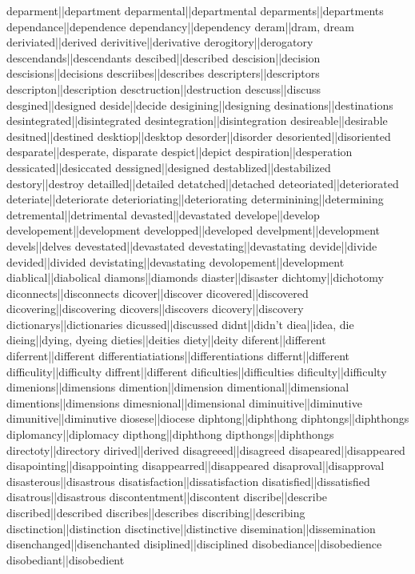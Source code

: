 deparment||department
deparmental||departmental
deparments||departments
dependance||dependence
dependancy||dependency
deram||dram, dream
deriviated||derived
derivitive||derivative
derogitory||derogatory
descendands||descendants
descibed||described
descision||decision
descisions||decisions
descriibes||describes
descripters||descriptors
descripton||description
desctruction||destruction
descuss||discuss
desgined||designed
deside||decide
desigining||designing
desinations||destinations
desintegrated||disintegrated
desintegration||disintegration
desireable||desirable
desitned||destined
desktiop||desktop
desorder||disorder
desoriented||disoriented
desparate||desperate, disparate
despict||depict
despiration||desperation
dessicated||desiccated
dessigned||designed
destablized||destabilized
destory||destroy
detailled||detailed
detatched||detached
deteoriated||deteriorated
deteriate||deteriorate
deterioriating||deteriorating
determinining||determining
detremental||detrimental
devasted||devastated
develope||develop
developement||development
developped||developed
develpment||development
devels||delves
devestated||devastated
devestating||devastating
devide||divide
devided||divided
devistating||devastating
devolopement||development
diablical||diabolical
diamons||diamonds
diaster||disaster
dichtomy||dichotomy
diconnects||disconnects
dicover||discover
dicovered||discovered
dicovering||discovering
dicovers||discovers
dicovery||discovery
dictionarys||dictionaries
dicussed||discussed
didnt||didn't
diea||idea, die
dieing||dying, dyeing
dieties||deities
diety||deity
diferent||different
diferrent||different
differentiatiations||differentiations
differnt||different
difficulity||difficulty
diffrent||different
dificulties||difficulties
dificulty||difficulty
dimenions||dimensions
dimention||dimension
dimentional||dimensional
dimentions||dimensions
dimesnional||dimensional
diminuitive||diminutive
dimunitive||diminutive
diosese||diocese
diphtong||diphthong
diphtongs||diphthongs
diplomancy||diplomacy
dipthong||diphthong
dipthongs||diphthongs
directoty||directory
dirived||derived
disagreeed||disagreed
disapeared||disappeared
disapointing||disappointing
disappearred||disappeared
disaproval||disapproval
disasterous||disastrous
disatisfaction||dissatisfaction
disatisfied||dissatisfied
disatrous||disastrous
discontentment||discontent
discribe||describe
discribed||described
discribes||describes
discribing||describing
disctinction||distinction
disctinctive||distinctive
disemination||dissemination
disenchanged||disenchanted
disiplined||disciplined
disobediance||disobedience
disobediant||disobedient
